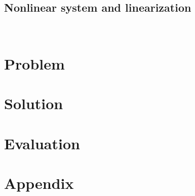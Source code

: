 \subsection{Nonlinear system and linearization}
~\label{sec:system}
%
\section{Problem}



\section{Solution}

%
\section{Evaluation}












\section{Appendix}




